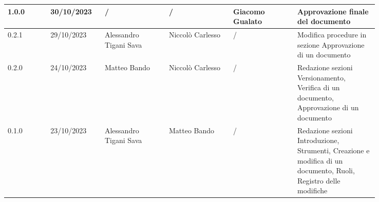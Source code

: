 {\begin{longtable}{p{0.10\linewidth}p{0.10\linewidth}p{0.15\linewidth}p{0.15\linewidth}p{0.15\linewidth}p{0.19\linewidth}}
	  \hline
	  1.0.0	& 30/10/2023    & /                      & /				& Giacomo Gualato	& Approvazione finale del documento \\
	  \hline
	  0.2.1	& 29/10/2023    & Alessandro Tigani Sava & Niccolò Carlesso	& /					& Modifica procedure in sezione Approvazione di un documento	\\
	  \hline
	  0.2.0	& 24/10/2023    & Matteo Bando           & Niccolò Carlesso	& /					& Redazione sezioni Versionamento, Verifica di un documento, Approvazione di un documento	\\
	  \hline
	  0.1.0	& 23/10/2023    & Alessandro Tigani Sava & Matteo Bando		& /					& Redazione sezioni Introduzione, Strumenti, Creazione e modifica di un documento, Ruoli, Registro delle modifiche	\\
	  \hline
  \end{longtable}
 }
